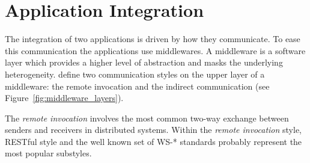 \section{Application Integration}
\label{sec:soa_integration}

%
%


The integration of two applications is driven by how they communicate.
To ease this communication the applications use middlewares.
A middleware is a software layer which provides a higher level of abstraction and masks the underlying heterogeneity.
\citet{coulouris_distributed_2012} define two communication styles on the upper layer of a middleware: %
the remote invocation and the indirect communication (see Figure~\ref{fig:middleware_layers}).



The \emph{remote invocation} involves the most common two-way exchange between senders and receivers in distributed systems.
Within the \emph{remote invocation} style, RESTful style \citep{fielding_architectural_2000} and the well known set of WS-* \citep{alonso_web_2010} standards probably represent the most popular substyles.


\medskip


